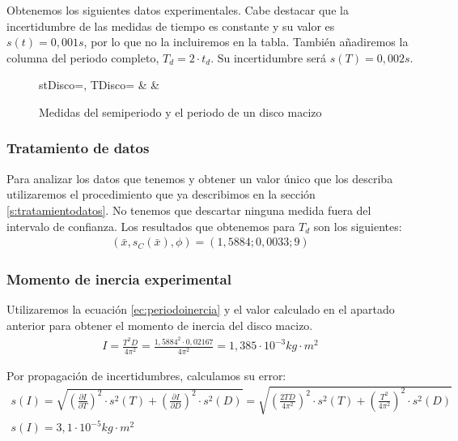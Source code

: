 \documentclass[12pt, a4paper, titlepage]{article}
\begin{document}
  Obtenemos los siguientes datos experimentales. Cabe destacar que la incertidumbre de las medidas de tiempo es constante y su valor es $s(t) = 0,001 s$, por lo que no la incluiremos en la tabla. También añadiremos la columna del periodo completo, $T_d = 2 \cdot t_d$. Su incertidumbre será $s(T) = 0,002 s$.

  \begin{figure}[H]
    \begin{table}[H]
      \centering
        {stDisco=\semiperiodo, TDisco=\periodo}
        {\thecsvrow & \semiperiodo & \periodo}
    \end{table}
    \caption{Medidas del semiperiodo y el periodo de un disco macizo}
  \end{figure}

  \subsubsection{Tratamiento de datos}

  Para analizar los datos que tenemos y obtener un valor único que los describa utilizaremos el procedimiento que ya describimos en la sección \ref{s:tratamientodatos}. No tenemos que descartar ninguna medida fuera del intervalo de confianza. Los resultados que obtenemos para $T_d$ son los siguientes:
  \begin{gather*}
    (\bar{x}, s_C(\bar{x}), \phi) = (1,5884;0,0033;9)
  \end{gather*}

  \subsubsection{Momento de inercia experimental}

  Utilizaremos la ecuación \ref{ec:periodoinercia} y el valor calculado en el apartado anterior para obtener el momento de inercia del disco macizo.
  \begin{gather*}
    I = \frac{T^2 D}{4 \pi^2} = \frac{1,5884^2 \cdot 0,02167}{4 \pi^2} = 1,385 \cdot 10^{-3} kg \cdot m^2
  \end{gather*}

  Por propagación de incertidumbres, calculamos su error:
  \begin{gather}
    s(I) = \sqrt{\left(\frac{\partial I}{\partial T}\right)^2 \cdot s^2(T) + \left(\frac{\partial I}{\partial D}\right)^2 \cdot s^2(D)} = \sqrt{\left(\frac{2 T D}{4 \pi^2}\right)^2 \cdot s^2(T) + \left(\frac{T^2}{4 \pi^2}\right)^2 \cdot s^2(D)} \label{ec:sinexp} \\
    s(I) = 3,1 \cdot 10^{-5} kg \cdot m^2 \nonumber
  \end{gather}
\end{document}

